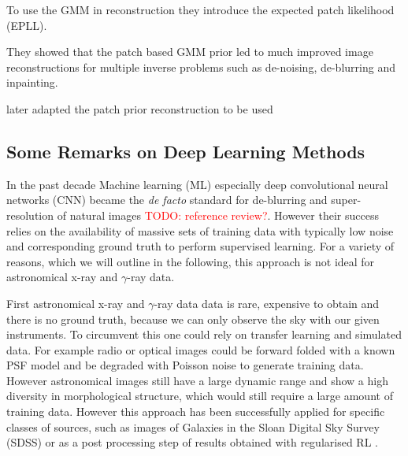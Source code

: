 \documentclass[twocolumn]{aastex631}
\newcommand{\gammaray}{$\gamma$-ray\xspace}
\newcommand{\todo}[1]{\textcolor{red}{TODO: #1}\PackageWarning{TODO:}{#1!}}
\begin{document}
    To use the GMM in reconstruction they introduce the expected patch likelihood (EPLL). 
    
    They showed that the patch based GMM prior led to much improved image reconstructions for multiple inverse problems such as de-noising, de-blurring and inpainting.

    \cite{Bouman2016} later adapted the patch prior reconstruction to be used
    
    

    \subsection{Some Remarks on Deep Learning Methods}
    In the past decade Machine learning (ML) especially deep convolutional neural networks (CNN) became the \textit{de facto} standard for de-blurring and super-resolution of natural images \todo{reference review?}. However their success relies on the availability of massive sets of training data with typically low noise and corresponding ground truth to perform supervised learning. For a variety of reasons, which we will outline in the following, this approach is not ideal for astronomical x-ray and \gammaray data.
    
    First astronomical x-ray and \gammaray data data is rare, expensive to obtain and there is no ground truth, because we can only observe the sky with our given instruments. To circumvent this one could rely on transfer learning and simulated data. For example radio or optical images could be forward folded with a known PSF model and be degraded with Poisson noise to generate training data. However astronomical images still have a large dynamic range and show a high diversity in morphological structure, which would still require a large amount of training data. However this approach has been successfully applied for specific classes of sources, such as images of Galaxies in the Sloan Digital Sky Survey (SDSS) \citep{Schawinski2017} or as a post processing step of results obtained with regularised RL \citep{Akhaury2022}.
\end{document}
